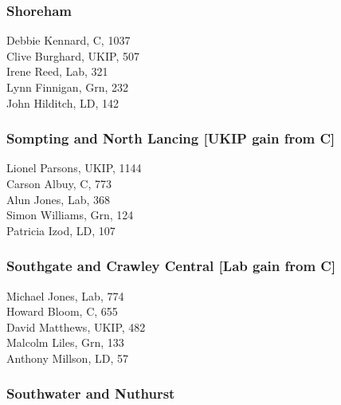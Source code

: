 \documentclass[a4paper,openany,10pt]{book}
\begin{document}
\subsubsection*{Shoreham}



Debbie Kennard, C, 1037\\
Clive Burghard, UKIP, 507\\
Irene Reed, Lab, 321\\
Lynn Finnigan, Grn, 232\\
John Hilditch, LD, 142\\


\subsubsection*{Sompting and North Lancing \hspace*{\fill}\nolinebreak[1]%
\enspace\hspace*{\fill}
[UKIP gain from C]}



Lionel Parsons, UKIP, 1144\\
Carson Albuy, C, 773\\
Alun Jones, Lab, 368\\
Simon Williams, Grn, 124\\
Patricia Izod, LD, 107\\


\subsubsection*{Southgate and Crawley Central \hspace*{\fill}\nolinebreak[1]%
\enspace\hspace*{\fill}
[Lab gain from C]}



Michael Jones, Lab, 774\\
Howard Bloom, C, 655\\
David Matthews, UKIP, 482\\
Malcolm Liles, Grn, 133\\
Anthony Millson, LD, 57\\


\subsubsection*{Southwater and Nuthurst}
\end{document}
